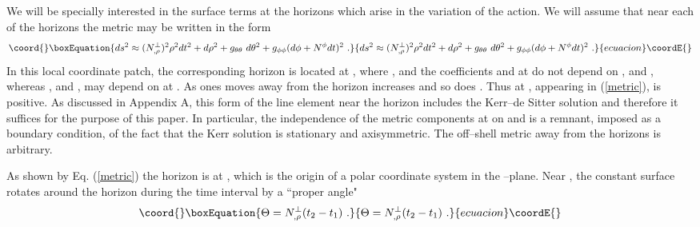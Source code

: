 \documentclass[a4paper,preprintnumbers,amsmath,amssymb]{revtex4}
\begin{document}
We will be specially interested in the surface terms at the horizons which arise in the variation of the action. We will assume that near each of the horizons the metric
may be written in the form
\begin{equation}\coord{}\boxEquation{
\label{metric}
ds^2 \approx (N^{\perp}_{,\rho})^2 \rho^2 dt^2 + d\rho^2 + g_{\theta\theta}\ d\theta^2
+ g_{\phi\phi}(d\phi+N^{\phi}dt)^2 \ .
}{
ds^2 \approx (N^{\perp}_{,\rho})^2 \rho^2 dt^2 + d\rho^2 + g_{\theta\theta}\ d\theta^2
+ g_{\phi\phi}(d\phi+N^{\phi}dt)^2 \ .
}{ecuacion}\coordE{}\end{equation}
In this local coordinate patch, the corresponding horizon is located at \coordHE{}, where
\coordHE{}, and the coefficients \coordHE{} and \coordHE{} at \coordHE{} do not depend on \coordHE{}, \myHighlight{$\theta$}\coordHE{} and \myHighlight{$\phi$}\coordHE{}, whereas \coordHE{},
and \coordHE{}, may depend on \myHighlight{$\theta$}\coordHE{} at \coordHE{}. As ones moves away from the horizon \myHighlight{$\rho$}\coordHE{} increases and so does \coordHE{}. Thus
\coordHE{} at \coordHE{}, appearing in (\ref{metric}), is positive.
As discussed in Appendix A, this form of the line element near the horizon includes the Kerr--de Sitter solution and therefore it suffices for the purpose of this paper. In particular, the independence of the metric components at \coordHE{} on \coordHE{} and \myHighlight{$\phi$}\coordHE{} is a remnant, imposed as a boundary condition, of the fact that the Kerr solution is stationary and axisymmetric. The off--shell metric away from the horizons is arbitrary.


As shown by Eq. (\ref{metric}) the horizon is at \coordHE{}, which is the origin
of a polar coordinate system in the \coordHE{}--plane. Near \coordHE{}, the \coordHE{}constant surface rotates around the horizon during the time interval \coordHE{} by a
``proper angle"
\begin{equation}\coord{}\boxEquation{
\Theta= N^{\perp}_{,\rho} (t_2-t_1) \ .
\label{angle}
}{
\Theta= N^{\perp}_{,\rho} (t_2-t_1) \ .
}{ecuacion}\coordE{}\end{equation}
\end{document}
